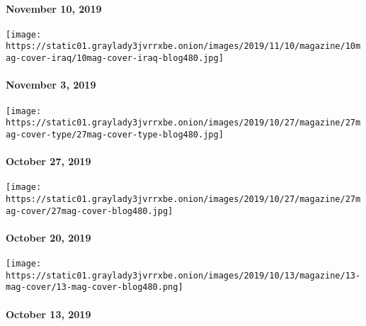 \hypertarget{november-10-2019}{%
\paragraph{November 10, 2019}\label{november-10-2019}}

\href{https://www.nytimes3xbfgragh.onion/issue/magazine/2019/11/01/the-11319-issue}{}

\texttt{[image: https://static01.graylady3jvrrxbe.onion/images/2019/11/10/magazine/10mag-cover-iraq/10mag-cover-iraq-blog480.jpg]}

\hypertarget{november-3-2019}{%
\paragraph{November 3, 2019}\label{november-3-2019}}

\href{https://www.nytimes3xbfgragh.onion/issue/magazine/2019/10/25/the-102719-issue}{}

\texttt{[image: https://static01.graylady3jvrrxbe.onion/images/2019/10/27/magazine/27mag-cover-type/27mag-cover-type-blog480.jpg]}

\hypertarget{october-27-2019}{%
\paragraph{October 27, 2019}\label{october-27-2019}}

\href{https://www.nytimes3xbfgragh.onion/issue/magazine/2019/10/18/the-102019-issue}{}

\texttt{[image: https://static01.graylady3jvrrxbe.onion/images/2019/10/27/magazine/27mag-cover/27mag-cover-blog480.jpg]}

\hypertarget{october-20-2019}{%
\paragraph{October 20, 2019}\label{october-20-2019}}

\href{https://www.nytimes3xbfgragh.onion/issue/magazine/2019/10/11/the-101319-issue}{}

\texttt{[image: https://static01.graylady3jvrrxbe.onion/images/2019/10/13/magazine/13-mag-cover/13-mag-cover-blog480.png]}

\hypertarget{october-13-2019}{%
\paragraph{October 13, 2019}\label{october-13-2019}}

